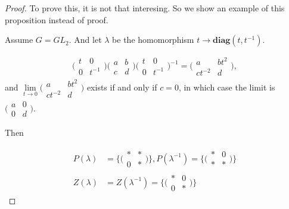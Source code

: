 \documentclass[12pt,a4paper,english]{article}
\theoremstyle{plain}
\theoremstyle{definition}
\begin{document}
\begin{proof}
To prove this, it is not that interesing. So we show an example of this proposition instead of proof.

Assume $G=GL_{2}$. And let $\lambda$ be the homomorphism $t\rightarrow \textbf{diag}(t,t^{-1})$.

\begin{equation*}
    \bigg(\begin{array}{cc}
        t & 0 \\
        0 & t^{-1}
    \end{array}\bigg)
    \bigg(\begin{array}{cc}
        a & b \\
         c& d
    \end{array}\bigg)
    \bigg(\begin{array}{cc}
        t & 0 \\
        0 & t^{-1}
    \end{array}\bigg)^{-1}=
    \bigg(\begin{array}{cc}
        a & bt^{2} \\
         ct^{-2}& d
    \end{array}\bigg),
\end{equation*}
and $\lim\limits_{t\rightarrow0}
    \bigg(\begin{array}{cc}
        a & bt^{2} \\
        ct^{-2} & d
    \end{array}\bigg)
$
exists if and only if $c=0$, in which case the limit is $\bigg(\begin{array}{cc}
    a &  0\\
     0& d
\end{array}\bigg).$

Then

\begin{align*}
       P(\lambda)&=\bigg\{\bigg(\begin{array}{cc}
        * & * \\
        0 & *
    \end{array}\bigg)\bigg\},
     P(\lambda^{-1})=\bigg\{\bigg(\begin{array}{cc}
        * & 0 \\
        * & *
    \end{array}\bigg)\bigg\}\\
    Z(\lambda)&=Z(\lambda^{-1})=\bigg\{\bigg(\begin{array}{cc}
        * & 0 \\
        0 & *
    \end{array}\bigg)\bigg\}
\end{align*}

\end{proof}
\end{document}
